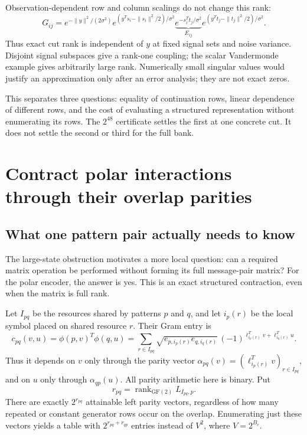 \documentclass[10pt,a4paper]{article}
\begin{document}
Observation-dependent row and column scalings do not change this rank:
\[
 G_{ij}=e^{-\|y\|^2/(2\sigma^2)}
 e^{(y^Ts_i-\|s_i\|^2/2)/\sigma^2}
 \underbrace{e^{-s_i^Tt_j/\sigma^2}}_{E_{ij}}
 e^{(y^Tt_j-\|t_j\|^2/2)/\sigma^2}.
\]
Thus exact cut rank is independent of $y$ at fixed signal sets and noise variance.
Disjoint signal subspaces give a rank-one coupling; the scalar Vandermonde example gives arbitrarily large rank.
Numerically small singular values would justify an approximation only after an error analysis; they are not
exact zeros.

This separates three questions: equality of continuation rows, linear dependence of different rows, and the cost
of evaluating a structured representation without enumerating its rows. The $2^{48}$ certificate settles the
first at one concrete cut. It does not settle the second or third for the full bank.

\clearpage
\section{Contract polar interactions through their overlap parities}
\label{sec:pair-contraction}
\subsection{What one pattern pair actually needs to know}
The large-state obstruction motivates a more local question: can a required matrix operation be performed
without forming its full message-pair matrix? For the polar encoder, the answer is yes.
This is an exact structured contraction, even when the matrix is full rank.

Let $I_{pq}$ be the resources shared by patterns $p$ and $q$, and let $i_p(r)$ be the local symbol placed
on shared resource $r$. Their Gram entry is
\begin{equation}
 c_{pq}(v,u)=\phi(p,v)^T\phi(q,u)
 =\sum_{r\in I_{pq}}\sqrt{e_{p,i_p(r)}e_{q,i_q(r)}}\,
       (-1)^{\ell_{i_p(r)}^Tv+\ell_{i_q(r)}^Tu}.
 \label{eq:overlap-gram}
\end{equation}
Thus it depends on $v$ only through the parity vector
$\alpha_{pq}(v)=(\ell_{i_p(r)}^Tv)_{r\in I_{pq}}$, and on $u$ only through $\alpha_{qp}(u)$.
All parity arithmetic here is binary. Put
\[
 r_{pq}=\operatorname{rank}_{\mathrm{GF}(2)}L_{I_{pq},p}.
\]
There are exactly $2^{r_{pq}}$ attainable left parity vectors, regardless of how many repeated or constant
generator rows occur on the overlap. Enumerating just these vectors yields a table with
$2^{r_{pq}+r_{qp}}$ entries instead of $V^2$, where $V=2^{B_c}$.
\end{document}
